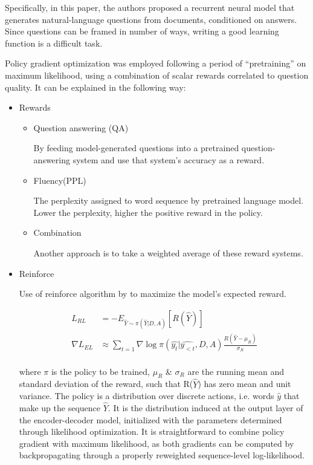 \documentclass[12pt,leqno,a4paper]{article}
\begin{document}
Specifically, in this paper, the authors proposed a recurrent neural model that generates natural-language questions from documents, conditioned on answers. Since questions can be framed in number of ways, writing a good learning function is a difficult task. 

Policy gradient optimization was employed following a period of “pretraining” on maximum likelihood, using a combination of scalar rewards correlated to question quality. It can be explained in the following way:

\begin{itemize}
    \item Rewards
    \begin{itemize}
        \item Question answering (QA) 
        
        By feeding model-generated questions into a pretrained question-answering system and use that system’s accuracy as a reward.
        \item Fluency(PPL)
        
        The perplexity assigned to word sequence by pretrained language model. Lower the perplexity, higher the positive reward in the policy.
        
        \item Combination
        
        Another approach is to take a weighted average of these reward systems. 
        
    \end{itemize}
    \item Reinforce
    
    Use of reinforce algorithm by \cite{Williams} to maximize the model’s expected reward.
    
    \begin{equation} \label{eq4}
    \begin{split}
        L_{RL}&=-E_{\hat{Y}\sim \pi (\hat{Y}|D, A)}[R(\hat{Y})]\\
        \nabla L_{EL}& \approx \sum_{t=1} \nabla \log \pi(\hat{y_t}|\hat{y_{<t}},D,A)\frac{R(\hat{Y}-\mu_R)}{\sigma_R} \\
\end{split}
\end{equation}

where $\pi$ is the policy to be trained, $\mu_R$ \& $\sigma_R$ are the running mean and standard deviation of the reward, such that
R($\hat{Y}$) has zero mean and unit variance.  The policy is a distribution over discrete actions, i.e. words $\hat{y}$ that make up the sequence $\hat{Y}$. It is the distribution induced at the output layer of the encoder-decoder model, initialized with the parameters determined through likelihood optimization. It is straightforward to combine policy gradient with maximum likelihood, as both gradients can be computed by backpropagating through a properly reweighted sequence-level log-likelihood.


\end{itemize}
\end{document}
